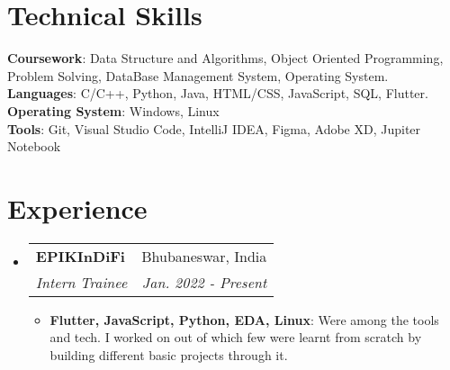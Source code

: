 \documentclass[letterpaper,11pt]{article}
\makeatletter
\newcommand{\resumeItem}[2]{
  \item\small{
    \textbf{#1}{: #2 \vspace{-2pt}}
  }
}
\newcommand{\resumeSubheading}[4]{
  \vspace{-1pt}\item
    \begin{tabular*}{0.97\textwidth}[t]{l@{\extracolsep{\fill}}r}
      \textbf{#1} & #2 \\
      \textit{\small#3} & \textit{\small #4} \\
    \end{tabular*}\vspace{-5pt}
}
\newcommand{\resumeSubSubheading}[2]{
    \begin{tabular*}{0.97\textwidth}{l@{\extracolsep{\fill}}r}
      \textit{\small#1} & \textit{\small #2} \\
    \end{tabular*}\vspace{-5pt}
}
\newcommand{\resumeSubHeadingListStart}{\begin{itemize}[leftmargin=*]}
\newcommand{\resumeSubHeadingListEnd}{\end{itemize}}
\newcommand{\resumeItemListStart}{\begin{itemize}}
\newcommand{\resumeItemListEnd}{\end{itemize}\vspace{-5pt}}
\makeatother
\begin{document}
\section{Technical Skills}
 \begin{itemize}[leftmargin=0.15in, label={}]
	\small{\item{
		\textbf{Coursework}{: Data Structure and Algorithms, Object Oriented Programming, Problem Solving, DataBase Management System, Operating System.} \\
 	\textbf{Languages}{: C/C++, Python, Java, HTML/CSS, JavaScript, SQL, Flutter.} \\
 		\textbf{Operating System}{: Windows, Linux}\\
 		\textbf{Tools}{: Git, Visual Studio Code, IntelliJ IDEA, Figma, Adobe XD, Jupiter Notebook}\\
	}}
 \end{itemize}
 \vspace{-16pt}
 

\section{Experience}
  \resumeSubHeadingListStart

    \resumeSubheading
      {EPIKInDiFi}{Bhubaneswar, India}
      {Intern Trainee}{Jan. 2022 - Present}
      \resumeItemListStart
        \resumeItem{Flutter, JavaScript, Python, EDA, Linux}
          {Were among the tools and tech. I worked on out of which few were learnt from scratch by building different basic projects through it.}
      \resumeItemListEnd
    \resumeSubHeadingListEnd
      
      

      
%

\end{document}
